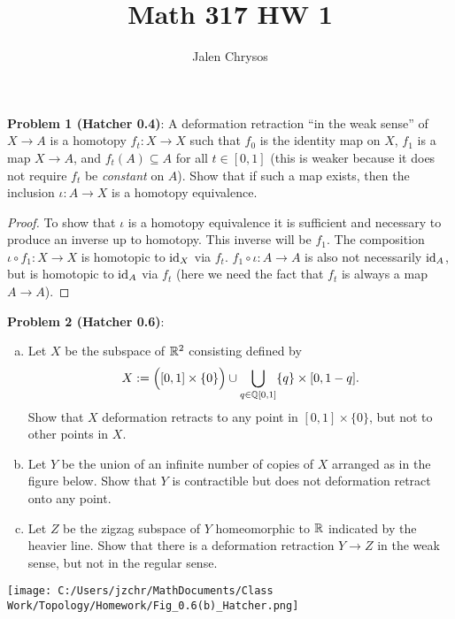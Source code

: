 \documentclass{amsart}
\title{Math 317 HW 1}
\author{Jalen Chrysos}
\begin{document}
	
	\maketitle

\noindent \textbf{Problem 1 (Hatcher 0.4)}: A deformation retraction ``in the weak sense'' of $X\to A$ is a homotopy $f_t:X\to X$ such that $f_0$ is the identity map on $X$, $f_1$ is a map $X\to A$, and $f_t(A)\subseteq A$ for all $t\in [0,1]$ (this is weaker because it does not require $f_t$ be \textit{constant} on $A$). Show that if such a map exists, then the inclusion $\iota:A\to X$ is a homotopy equivalence.

\begin{proof}
	To show that $\iota$ is a homotopy equivalence it is sufficient and necessary to produce an inverse up to homotopy. This inverse will be $f_1$. The composition $\iota \circ f_1:X\to X$ is homotopic to $\operatorname{id}_X$ via $f_t$. $f_1\circ \iota:A\to A$ is also not necessarily $\operatorname{id}_A$, but is homotopic to $\operatorname{id}_A$ via $f_t$ (here we need the fact that $f_t$ is always a map $A\to A$).
\end{proof}

\newpage 


\noindent \textbf{Problem 2 (Hatcher 0.6)}: 
\begin{enumerate}[(a)]
	\item Let $X$ be the subspace of $\mathbb{R}^2$ consisting defined by
	$$
	X := \Big([0,1]\times \{0\} \Big) \cup \bigcup_{q\in \mathbb{Q}[0,1]} \{q\}\times [0,1-q].
	$$
	Show that $X$ deformation retracts to any point in $[0,1]\times \{0\}$, but not to other points in $X$.
	\item Let $Y$ be the union of an infinite number of copies of $X$ arranged as in the figure below. Show that $Y$ is contractible but does not deformation retract onto any point.
	\item Let $Z$ be the zigzag subspace of $Y$ homeomorphic to $\mathbb{R}$ indicated by the heavier line. Show that there is a deformation retraction $Y\to Z$ in the weak sense, but not in the regular sense.
\end{enumerate}

\texttt{[image: C:/Users/jzchr/MathDocuments/Class Work/Topology/Homework/Fig\_0.6(b)\_Hatcher.png]}
\end{document}
